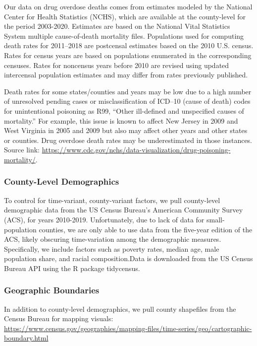 \documentclass[
  11pt,
]{article}
\begin{document}
Our data on drug overdose deaths comes from estimates modeled by the
National Center for Health Statistics (NCHS), which are available at the
county-level for the period 2003-2020. Estimates are based on the
National Vital Statistics System multiple cause-of-death mortality
files. Populations used for computing death rates for 2011--2018 are
postcensal estimates based on the 2010 U.S. census. Rates for census
years are based on populations enumerated in the corresponding censuses.
Rates for noncensus years before 2010 are revised using updated
intercensal population estimates and may differ from rates previously
published.

Death rates for some states/counties and years may be low due to a high
number of unresolved pending cases or misclassification of ICD--10
(cause of death) codes for unintentional poisoning as R99, ``Other
ill-defined and unspecified causes of mortality.'' For example, this
issue is known to affect New Jersey in 2009 and West Virginia in 2005
and 2009 but also may affect other years and other states or counties.
Drug overdose death rates may be underestimated in those instances.
Source link:
\url{https://www.cdc.gov/nchs/data-visualization/drug-poisoning-mortality/}.

\hypertarget{county-level-demographics}{%
\subsubsection{County-Level
Demographics}\label{county-level-demographics}}

To control for time-variant, county-variant factors, we pull
county-level demographic data from the US Census Bureau's American
Community Survey (ACS), for years 2010-2019. Unfortunately, due to lack
of data for small-population counties, we are only able to use data from
the five-year edition of the ACS, likely obscuring time-variation among
the demographic measures. Specifically, we include factors such as
poverty rates, median age, male population share, and racial
composition.Data is downloaded from the US Census Bureau API using the R
package tidycensus.

\hypertarget{geographic-boundaries}{%
\subsubsection{Geographic Boundaries}\label{geographic-boundaries}}

In addition to county-level demographics, we pull county shapefiles from
the Census Bureau for mapping visuals:
\url{https://www.census.gov/geographies/mapping-files/time-series/geo/cartographic-boundary.html}
\end{document}
